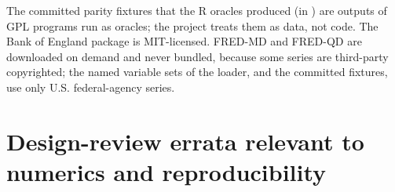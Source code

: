 The committed parity fixtures that the R oracles produced (in ) are
outputs of GPL programs run as oracles; the project treats them as data, not code.
The Bank of England  package \citep{labonne2026bvar} is MIT-licensed.
FRED-MD and FRED-QD \citep{mccracken2016fredmd,mccracken2021fredqd} are downloaded on demand and
never bundled, because some series are third-party copyrighted; the named variable sets of the
loader, and the committed fixtures, use only U.S. federal-agency series.

\section{Design-review errata relevant to numerics and reproducibility}\label{app:errata}


